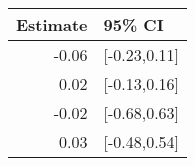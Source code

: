 \begin{tabular}{rl}
  \hline
Estimate & 95\% CI \\ 
  \hline
-0.06 & [-0.23,0.11] \\ 
  0.02 & [-0.13,0.16] \\ 
  -0.02 & [-0.68,0.63] \\ 
  0.03 & [-0.48,0.54] \\ 
   \hline
\end{tabular}

